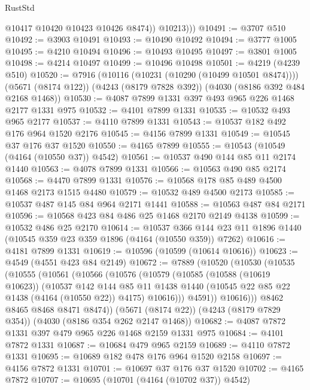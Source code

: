 \begin{lexlean}{RustStd}
\begin{coremodule}
              @10417
              @10420
              @10423
              @10426
              @8474))
          @10213)))
@10491 := @3707 @510
@10492 := @3903 @10491
@10493 := @10490 @10492
@10494 := @3777 @1005
@10495 := @4210 @10494
@10496 := @10493 @10495
@10497 := @3801 @1005
@10498 := @4214 @10497
@10499 := @10496 @10498
@10501 := @4219 (@4239 @510)
@10520 := @7916
    (@10116 (@10231 (@10290 (@10499 @10501 @8474))))
    (@5671 (@8174 @122))
    (@4243 (@8179 @7828 @392))
    (@4030 (@8186 @392 @484 @2168 @1468))
@10530 := @4087 @7899 @1331 @397 @493 @965 @226 @1468 @2177 @1331 @975
@10532 := @4101 @7899 @1331
@10535 := @10532 @493 @965 @2177
@10537 := @4110 @7899 @1331
@10543 := @10537 @182 @492 @176 @964 @1520 @2176
@10545 := @4156 @7899 @1331
@10549 := @10545 @37 @176 @37 @1520
@10550 := @4165 @7899
@10555 := @10543 (@10549 (@4164 (@10550 @37)) @4542)
@10561 := @10537 @490 @144 @85 @11 @2174 @1440
@10563 := @4078 @7899 @1331
@10566 := @10563 @490 @85 @2174
@10568 := @4470 @7899 @1331
@10576 := @10568 @178 @85 @489 @4500 @1468 @2173 @1515 @4480
@10579 := @10532 @489 @4500 @2173
@10585 := @10537 @487 @145 @84 @964 @2171 @1441
@10588 := @10563 @487 @84 @2171
@10596 := @10568 @423 @84 @486 @25 @1468 @2170 @2149 @4138
@10599 := @10532 @486 @25 @2170
@10614 := @10537
    @366
    @144
    @23
    @11
    @1896
    @1440
    (@10545 @359 @23 @359 @1896 (@4164 (@10550 @359)) @7262)
@10616 := @4181 @7899 @1331
@10619 := @10596 (@10599 (@10614 @10616))
@10623 := @4549 (@4551 @423 @84 @2149)
@10672 := @7889
    (@10520
      (@10530
        (@10535
          (@10555
            (@10561
              (@10566
                (@10576
                  (@10579
                    (@10585
                      (@10588 (@10619 @10623))
                      (@10537
                        @142
                        @144
                        @85
                        @11
                        @1438
                        @1440
                        (@10545 @22 @85 @22 @1438 (@4164 (@10550 @22)) @4175)
                        @10616)))
                  @4591))
              @10616)))
        @8462
        @8465
        @8468
        @8471
        @8474))
    (@5671 (@8174 @22))
    (@4243 (@8179 @7829 @354))
    (@4030 (@8186 @354 @262 @2147 @1468))
@10682 := @4087 @7872 @1331 @397 @479 @965 @226 @1468 @2159 @1331 @975
@10684 := @4101 @7872 @1331
@10687 := @10684 @479 @965 @2159
@10689 := @4110 @7872 @1331
@10695 := @10689 @182 @478 @176 @964 @1520 @2158
@10697 := @4156 @7872 @1331
@10701 := @10697 @37 @176 @37 @1520
@10702 := @4165 @7872
@10707 := @10695 (@10701 (@4164 (@10702 @37)) @4542)

\end{coremodule}
\end{lexlean}
